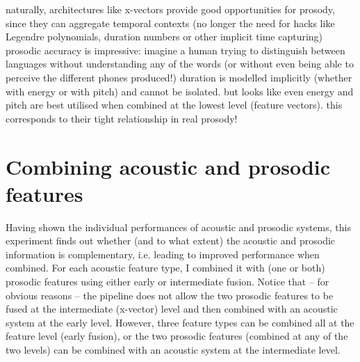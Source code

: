 \documentclass[bsc,frontabs,twoside,singlespacing,parskip,deptreport]{infthesis}
\begin{document}
{{    %
    naturally, architectures like x-vectors provide good opportunities for prosody, since they can aggregate temporal contexts (no longer the need for hacks like Legendre polynomials, duration numbers or other implicit time capturing)
    prosodic accuracy is impressive: imagine a human trying to distinguish between languages without understanding any of the words (or without even being able to perceive the different phones produced!)
    duration is modelled implicitly (whether with energy or with pitch) and cannot be isolated. but looks like even energy and pitch are best utilised when combined at the lowest level (feature vectors). this corresponds to their tight relationship in real prosody!
  }

  \section{Combining acoustic and prosodic features}{
    \label{sec:exp-acoustic+prosodic}

    Having shown the individual performances of acoustic and prosodic systems, this experiment finds out whether (and to what extent) the acoustic and prosodic information is complementary, i.e. leading to improved performance when combined. For each acoustic feature type, I combined it with (one or both) prosodic features using either early or intermediate fusion. Notice that -- for obvious reasons -- the pipeline does not allow the two prosodic features to be fused at the intermediate (x-vector) level and then combined with an acoustic system at the early level. However, three feature types can be combined all at the feature level (early fusion), or the two prosodic features (combined at any of the two levels) can be combined with an acoustic system at the intermediate level.

}}
\end{document}
